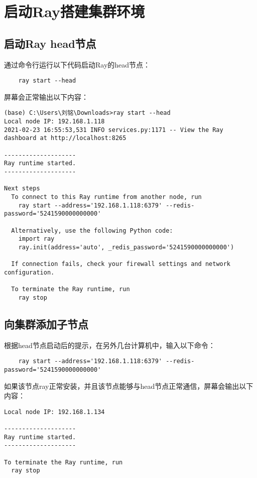 \section{启动Ray搭建集群环境}

\subsection{启动Ray head节点}
通过命令行运行以下代码启动Ray的head节点：
\lstset{language=Bash}
\begin{lstlisting}
    ray start --head
\end{lstlisting}

屏幕会正常输出以下内容：
\lstset{language=Bash, breaklines, columns=flexible}
\begin{lstlisting}
(base) C:\Users\刘铭\Downloads>ray start --head
Local node IP: 192.168.1.118
2021-02-23 16:55:53,531 INFO services.py:1171 -- View the Ray dashboard at http://localhost:8265

--------------------
Ray runtime started.
--------------------

Next steps
  To connect to this Ray runtime from another node, run
    ray start --address='192.168.1.118:6379' --redis-password='5241590000000000'

  Alternatively, use the following Python code:
    import ray
    ray.init(address='auto', _redis_password='5241590000000000')

  If connection fails, check your firewall settings and network configuration.

  To terminate the Ray runtime, run
    ray stop
\end{lstlisting}

\subsection{向集群添加子节点}
根据head节点启动后的提示，在另外几台计算机中，输入以下命令：
\lstset{language=Bash}
\begin{lstlisting}
    ray start --address='192.168.1.118:6379' --redis-password='5241590000000000'
\end{lstlisting}

如果该节点ray正常安装，并且该节点能够与head节点正常通信，屏幕会输出以下内容：
\lstset{language=Bash, breaklines, columns=flexible}
\begin{lstlisting}
Local node IP: 192.168.1.134

--------------------
Ray runtime started.
--------------------

To terminate the Ray runtime, run
  ray stop
\end{lstlisting}

